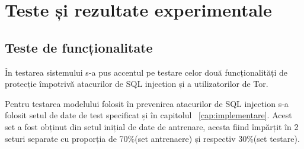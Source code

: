 
 \chapter{Teste și rezultate experimentale}
\label{cap:rezultate}

%
%
%

 \section{Teste de funcționalitate}
 
În testarea sistemului s-a pus accentul pe testare celor două funcționalități de protecție împotrivă atacurilor de SQL injection și a utilizatorilor de Tor. 

Pentru testarea modelului folosit în prevenirea atacurilor de SQL injection s-a folosit setul de date de test specificat și în capitolul ~\ref{cap:implementare}. Acest set a fost obținut din setul inițial de date de antrenare, acesta fiind împărțit în 2 seturi separate cu proporția de 70\%(set antrenaere) și respectiv 30\%(set testare). 
 
